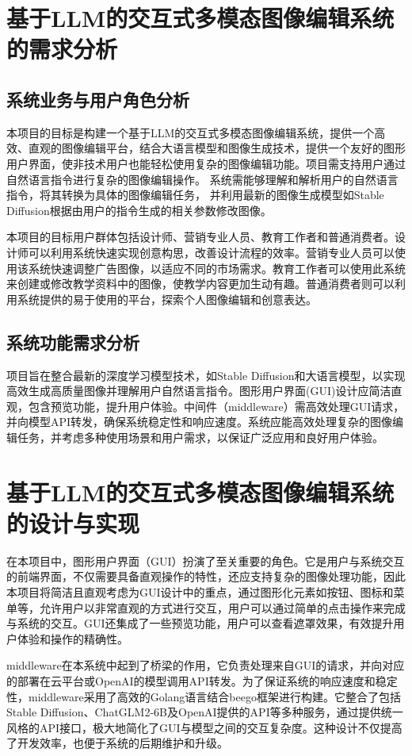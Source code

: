 \documentclass[a4paper,AutoFakeBold,oneside,12pt]{book}
\begin{document}
\chapter{基于LLM的交互式多模态图像编辑系统的需求分析}
\section{系统业务与用户角色分析}
本项目的目标是构建一个基于LLM的交互式多模态图像编辑系统，提供一个高效、直观的图像编辑平台，结合大语言模型和图像生成技术，提供一个友好的图形用户界面，使非技术用户也能轻松使用复杂的图像编辑功能。项目需支持用户通过自然语言指令进行复杂的图像编辑操作。
系统需能够理解和解析用户的自然语言指令，将其转换为具体的图像编辑任务，
并利用最新的图像生成模型如Stable Diffusion根据由用户的指令生成的相关参数修改图像。

本项目的目标用户群体包括设计师、营销专业人员、教育工作者和普通消费者。设计师可以利用系统快速实现创意构思，改善设计流程的效率。营销专业人员可以使用该系统快速调整广告图像，以适应不同的市场需求。教育工作者可以使用此系统来创建或修改教学资料中的图像，使教学内容更加生动有趣。普通消费者则可以利用系统提供的易于使用的平台，探索个人图像编辑和创意表达。

\section{系统功能需求分析}
项目旨在整合最新的深度学习模型技术，如Stable Diffusion和大语言模型，以实现高效生成高质量图像并理解用户自然语言指令。图形用户界面(GUI)设计应简洁直观，包含预览功能，提升用户体验。中间件（middleware）需高效处理GUI请求，并向模型API转发，确保系统稳定性和响应速度。系统应能高效处理复杂的图像编辑任务，并考虑多种使用场景和用户需求，以保证广泛应用和良好用户体验。

\chapter{基于LLM的交互式多模态图像编辑系统的设计与实现}
在本项目中，图形用户界面（GUI）扮演了至关重要的角色。它是用户与系统交互的前端界面，不仅需要具备直观操作的特性，还应支持复杂的图像处理功能，因此本项目将简洁且直观考虑为GUI设计中的重点，通过图形化元素如按钮、图标和菜单等，允许用户以非常直观的方式进行交互，用户可以通过简单的点击操作来完成与系统的交互。GUI还集成了一些预览功能，用户可以查看遮罩效果，有效提升用户体验和操作的精确性。

middleware在本系统中起到了桥梁的作用，它负责处理来自GUI的请求，并向对应的部署在云平台或OpenAI的模型调用API转发。为了保证系统的响应速度和稳定性，middleware采用了高效的Golang语言结合beego框架进行构建。它整合了包括Stable Diffusion、ChatGLM2-6B及OpenAI提供的API等多种服务，通过提供统一风格的API接口，极大地简化了GUI与模型之间的交互复杂度。这种设计不仅提高了开发效率，也便于系统的后期维护和升级。
\end{document}
